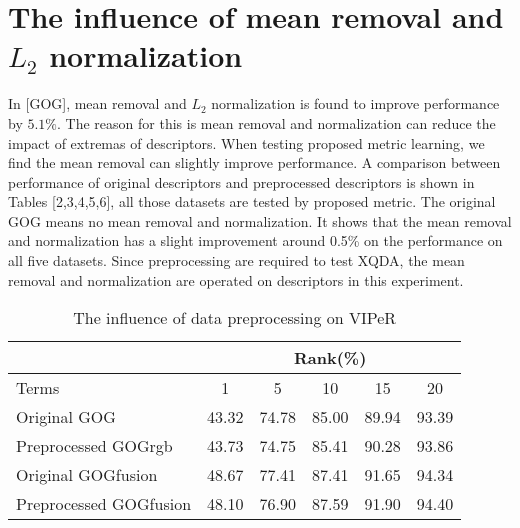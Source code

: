 \section{The influence of mean removal and $L_2$ normalization}
In [GOG], mean removal and $L_2$  normalization is found to improve performance by $5.1\%$. The reason for this is mean removal and normalization can reduce the impact of extremas of descriptors. When testing proposed metric learning, we find the mean removal can slightly improve performance. A comparison between performance of original descriptors and preprocessed descriptors is shown in Tables [2,3,4,5,6], all those datasets are tested by proposed metric. The original GOG means no mean removal and normalization. It shows that the mean removal and normalization has a slight improvement around 0.5\% on the performance on all five datasets. Since preprocessing are required to test XQDA, the mean removal and normalization are operated on descriptors in this experiment. 

\begin{table}[H]
\centering
\caption{The influence of data preprocessing on VIPeR}
\begin{tabular}{|l|c|c|c|c|c|}
\hline
 & \multicolumn{5}{|c|}{Rank(\%)} \\
 \hline
Terms  &1 &5 & 10 &15& 20\\
\hline
Original GOG &43.32&74.78& 85.00& 89.94& 93.39 \\
\hline
Preprocessed GOGrgb &43.73&74.75&85.41& 90.28&93.86\\
 \hline
Original GOGfusion &48.67&77.41&87.41&91.65&94.34\\
\hline
Preprocessed GOGfusion &48.10&76.90&87.59&91.90& 94.40\\
 \hline
 
\end{tabular}
\end{table}


